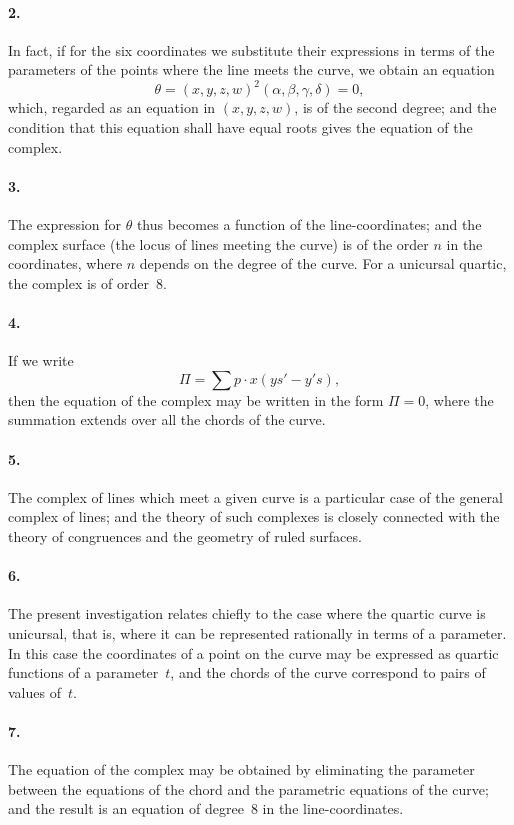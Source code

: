 \documentclass[11pt,a4paper]{article}
\theoremstyle{definition}
\begin{document}
\paragraph{2.} In fact, if for the six coordinates we substitute their expressions in terms of the parameters of the points where the line meets the curve, we obtain an equation
\[
\theta = (x, y, z, w)^{2}(\alpha, \beta, \gamma, \delta) = 0,
\]
which, regarded as an equation in $(x, y, z, w)$, is of the second degree; and the condition that this equation shall have equal roots gives the equation of the complex.

\paragraph{3.} The expression for $\theta$ thus becomes a function of the line-coordinates; and the complex surface (the locus of lines meeting the curve) is of the order $n$ in the coordinates, where $n$ depends on the degree of the curve. For a unicursal quartic, the complex is of order~8.

\paragraph{4.} If we write
\[
\Pi = \sum p \cdot x(ys' - y's),
\]
then the equation of the complex may be written in the form $\Pi = 0$, where the summation extends over all the chords of the curve.

\paragraph{5.} The complex of lines which meet a given curve is a particular case of the general complex of lines; and the theory of such complexes is closely connected with the theory of congruences and the geometry of ruled surfaces.

\paragraph{6.} The present investigation relates chiefly to the case where the quartic curve is unicursal, that is, where it can be represented rationally in terms of a parameter. In this case the coordinates of a point on the curve may be expressed as quartic functions of a parameter~$t$, and the chords of the curve correspond to pairs of values of~$t$.

\paragraph{7.} The equation of the complex may be obtained by eliminating the parameter between the equations of the chord and the parametric equations of the curve; and the result is an equation of degree~8 in the line-coordinates.
\end{document}
